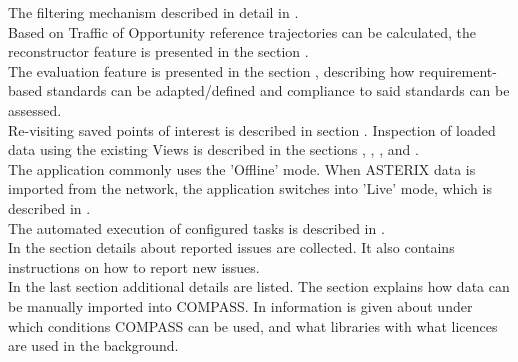 The filtering mechanism described in detail in . \\

Based on Traffic of Opportunity reference trajectories can be calculated, the reconstructor feature is presented in the section . \\

The evaluation feature is presented in the section , describing how requirement-based standards can be adapted/defined and compliance to said standards can be assessed. \\

Re-visiting saved points of interest is described in section . Inspection of loaded data using the existing Views is described in the sections , , ,  and . \\

The application commonly uses the 'Offline' mode. When ASTERIX data is imported from the network, the application switches into 'Live' mode, which is described in . \\

The automated execution of configured tasks is described in . \\

In the section  details about reported issues are collected. It also contains instructions on how to report new issues. \\

In the last section  additional details are listed. 
The section  explains how data can be manually imported into COMPASS. 
In  information is given about under which conditions COMPASS can be used, and what libraries with what licences are used in the background.

\pagebreak










